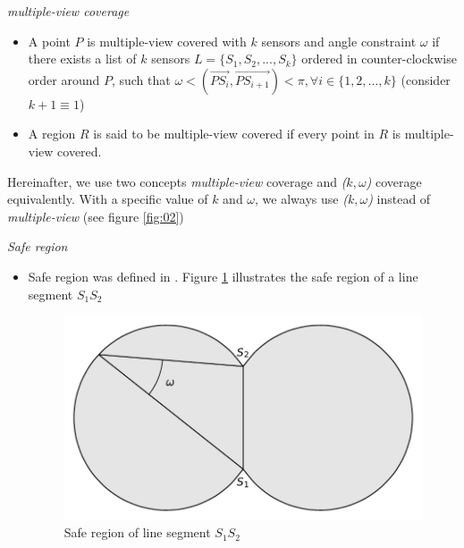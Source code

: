 
\begin{df} 
{\itshape multiple-view coverage}
\begin{itemize}
	\item A point $P$ is multiple-view covered with $k$ sensors and angle constraint $\omega$ if there exists a list of $k$ sensors $L = \{S_1, S_2,...,S_k\}$ ordered in counter-clockwise order around $P$, such that $\omega < (\overrightarrow{PS_i}, \overrightarrow{PS_{i+1}}) < \pi, \forall i \in \{1,2,...,k\}$ (consider $k + 1 \equiv 1$)
	\item A region $R$ is said to be multiple-view covered if every point in $R$ is multiple-view covered.
\end{itemize}
Hereinafter, we use two concepts {\itshape multiple-view} coverage and {\itshape ($k,\omega$)} coverage equivalently. With a specific value of $k$ and $\omega$, we always use {\itshape ($k,\omega$)} instead of {\itshape multiple-view} (see figure \ref{fig:02})
\end{df}
\begin{df}
{\itshape Safe region}
\begin{itemize}
	\item Safe region was defined in \cite{tseng2012k}. Figure \ref{saferegion} illustrates the safe region of a line segment $S_1S_2$
	\begin{figure}[h]
		\centering
		\includegraphics[scale=.5]{Hinhanh/safe-region}
		\caption{Safe region of line segment $S_1S_2$}
		\label{saferegion}
	\end{figure}
\end{itemize}
\end{df}
